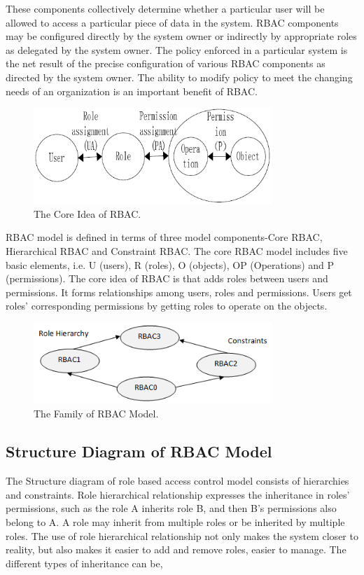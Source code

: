 \documentclass[12pt]{report}
\begin{document}
		 These components collectively determine whether a particular user will be allowed to access a particular piece of data in the system. RBAC components may be configured directly by the system owner or indirectly by appropriate roles as delegated by the system owner. The policy enforced in a particular system is the net result of the precise configuration of various RBAC components as directed by the system owner. The ability to modify policy to meet the changing needs of an organization is an important benefit of RBAC.
		\begin{figure}[H]
		\begin{center}
		\includegraphics[width=9cm]{./4-2.png}
		\caption{ The Core Idea of RBAC. \label{fig:The Core Idea of RBAC. }}
		\end{center}
		\end{figure}
		RBAC model is defined in terms of three model components-Core RBAC, Hierarchical RBAC and Constraint RBAC. The core RBAC model includes five basic elements, i.e. U (users), R (roles), O (objects), OP (Operations) and P (permissions). The core idea of RBAC is that adds roles between users and permissions. It forms relationships among users, roles and permissions. Users get roles’ corresponding permissions by getting roles to operate on the objects.
		\begin{figure}[H]
		\begin{center}
		\includegraphics[width=9cm]{./4-3.png}
		\caption{ The Family of RBAC Model. \label{fig:The Family of RBAC Model. }}
		\end{center}
		\end{figure}
	\newpage	
	\subsection{Structure Diagram of  RBAC Model}
		\hspace{6mm} The Structure diagram of role based access control model consists of hierarchies and constraints. Role hierarchical relationship expresses the inheritance in roles’ permissions, such as the role A inherits role B, and then B’s permissions also belong to A. A role may inherit from multiple roles or be inherited by multiple roles. The use of role hierarchical relationship not only makes the system closer to reality, but also makes it easier to add and remove roles, easier to manage. The different types of inheritance can be,\\
		
\end{document}
